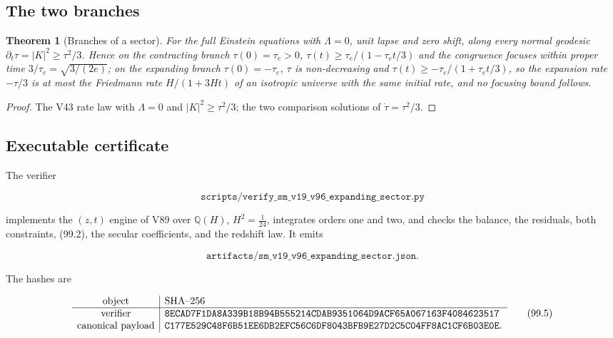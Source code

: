 \documentclass[11pt]{article}
\newtheorem{theorem}{Theorem}[section]
\theoremstyle{remark}
\begin{document}
\subsection{The two branches}

\begin{theorem}[Branches of a sector]
\label{thm:v19v96-branches}
For the full Einstein equations with \(\Lambda=0\), unit lapse and
zero shift, along every normal geodesic \(\partial_t\tau=|K|^2\geq\tau^2/3\).
Hence on the contracting branch \(\tau(0)=\tau_e>0\),
\(\tau(t)\geq\tau_e/(1-\tau_et/3)\) and the congruence focuses within
proper time \(3/\tau_e=\sqrt{3/(2e)}\); on the expanding branch
\(\tau(0)=-\tau_e\), \(\tau\) is non-decreasing and
\(\tau(t)\geq-\tau_e/(1+\tau_et/3)\), so the expansion rate
\(-\tau/3\) is at most the Friedmann rate \(H/(1+3Ht)\) of an
isotropic universe with the same initial rate, and no focusing bound
follows.
\end{theorem}

\begin{proof}
The V43 rate law with \(\Lambda=0\) and \(|K|^2\geq\tau^2/3\); the two
comparison solutions of \(\dot\tau=\tau^2/3\).
\end{proof}

\subsection{Executable certificate}

The verifier

\[
 \texttt{scripts/verify\_sm\_v19\_v96\_expanding\_sector.py}          \tag{99.3}
\]

implements the \((z,t)\) engine of V89 over \(\mathbb Q(H)\),
\(H^2=\tfrac1{24}\), integrates orders one and two, and checks the
balance, the residuals, both constraints, (99.2), the secular
coefficients, and the redshift law.  It emits

\[
 \texttt{artifacts/sm\_v19\_v96\_expanding\_sector.json}.             \tag{99.4}
\]

The hashes are

\[
\begin{array}{c|l}
\hbox{object}&\hbox{SHA--256}\\ \hline
\hbox{verifier}&
\texttt{8ECAD7F1DA8A339B18B94B555214CDAB9351064D9ACF65A067163F4084623517}\\
\hbox{canonical payload}&
\texttt{C177E529C48F6B51EE6DB2EFC56C6DF8043BFB9E27D2C5C04FF8AC1CF6B03E0E}.
\end{array}                                                     \tag{99.5}
\]
\end{document}
